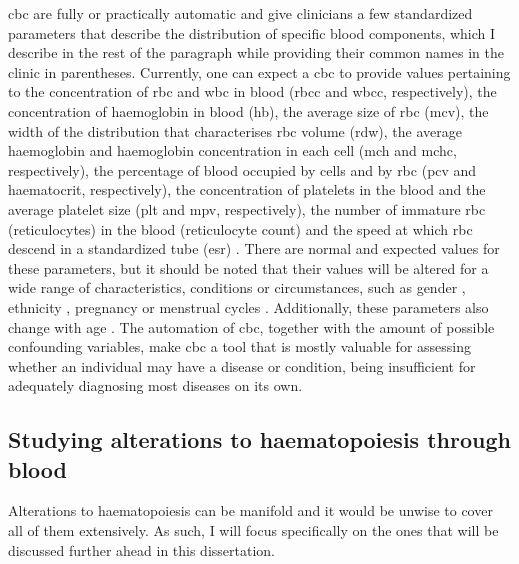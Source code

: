 \ac{cbc} are fully or practically automatic and give clinicians a few standardized parameters that describe the distribution of specific blood components, which I describe in the rest of the paragraph while providing their common names in the clinic in parentheses. Currently, one can expect a \ac{cbc} to provide values pertaining to the concentration of \ac{rbc} and \ac{wbc} in blood (\ac{rbcc} and \ac{wbcc}, respectively), the concentration of haemoglobin in blood (\ac{hb}), the average size of \ac{rbc} (\ac{mcv}), the width of the distribution that characterises \ac{rbc} volume (\ac{rdw}), the average haemoglobin and haemoglobin concentration in each cell (\ac{mch} and \ac{mchc}, respectively), the percentage of blood occupied by cells and by \ac{rbc} (\ac{pcv} and haematocrit, respectively), the concentration of platelets in the blood and the average platelet size (\ac{plt} and \ac{mpv}, respectively), the number of immature \ac{rbc} (reticulocytes) in the blood (reticulocyte count) and the speed at which \ac{rbc} descend in a standardized tube (\ac{esr}) \cite{Bain2014-oc,Evans1991-ri}. There are normal and expected values for these parameters, but it should be noted that their values will be altered for a wide range of characteristics, conditions or circumstances, such as gender \cite{Tong2019-eq,Guillet1998-hw}, ethnicity \cite{Lee2019-pr,Tong2019-eq}, pregnancy \cite{England1976-ff} or menstrual cycles \cite{Guillet1998-hw}. Additionally, these parameters also change with age \cite{Kubota1991-at,Mahlknecht2010-mo,Siemons2014-wa}. The automation of \ac{cbc}, together with the amount of possible confounding variables, make \ac{cbc} a tool that is mostly valuable for assessing whether an individual may have a disease or condition, being insufficient for adequately diagnosing most diseases on its own.

\subsection{Studying alterations to haematopoiesis through blood}

Alterations to haematopoiesis can be manifold and it would be unwise to cover all of them extensively. As such, I will focus specifically on the ones that will be discussed further ahead in this dissertation. 

